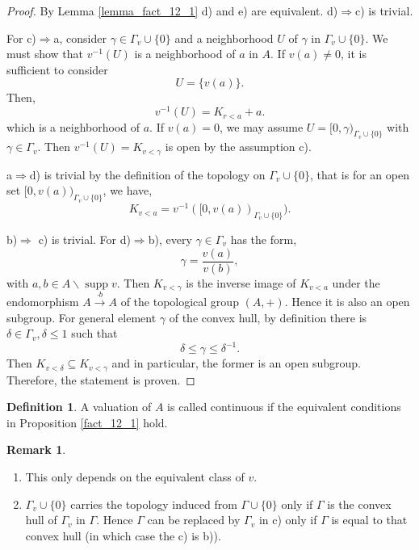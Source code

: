 \documentclass[10pt]{article}
\numberwithin{equation}{section}
\theoremstyle{definition}
\newtheorem{definition}{Definition}[subsection]
\newtheorem{remark}{Remark}[subsection]
\DeclareMathOperator{\supp}{supp}
\begin{document}
\begin{proof}
    By Lemma \ref{lemma_fact_12_1} d) and e) are equivalent. d)$\Rightarrow$c) is trivial.
    \par For c)$\Rightarrow$a, consider $\gamma\in\Gamma_v\cup\{0\}$ and a neighborhood $U$ of $\gamma$ in $\Gamma_v\cup\{0\}$. We must show that $v^{-1}(U)$ is a neighborhood of $a$ in $A$. If $v(a)\not=0$, it is sufficient to consider
    \begin{equation*}
        U = \{v(a)\}.
    \end{equation*}
    Then,
    \begin{equation*}
        v^{-1}(U) = K_{r<a}+a.
    \end{equation*}
    which is a neighborhood of $a$. If $v(a)=0$, we may assume $U=[0,\gamma)_{\Gamma_v\cup\{0\}}$ with $\gamma\in\Gamma_v$. Then $v^{-1}(U)=K_{v<\gamma}$ is open by the assumption c).
    \par a$\Rightarrow$d) is trivial by the definition of the topology on $\Gamma_v\cup\{0\}$, that is for an open set $[0,v(a))_{\Gamma_v\cup\{0\}}$, we have,
    \begin{equation*}
     K_{v<a} = v^{-1}([0,v(a))_{\Gamma_v\cup\{0\}}).
    \end{equation*}
    \par b)$\Rightarrow$ c) is trivial. For d)$\Rightarrow$b), every $\gamma\in\Gamma_v$ has the form,
    \begin{equation*}
        \gamma  = {\frac {v(a)} {v(b)}},
    \end{equation*}
    with $a,b\in A\backslash\supp v$. Then $K_{v<\gamma}$ is the inverse image of $K_{v<a}$ under the endomorphism $A\stackrel{\cdot b}{\to}A$ of the topological group $(A,+)$. Hence it is also an open subgroup. For general element $\gamma$ of the convex hull, by definition there is $\delta\in\Gamma_v,\delta\leq 1$ such that
    \begin{equation}
        \delta\leq \gamma\leq \delta^{-1}.
    \end{equation}
    Then $K_{v<\delta}\subseteq K_{v<\gamma}$ and in particular, the former is an open subgroup. Therefore, the statement is proven.
\end{proof}
\begin{definition}
    \label{definition_12_1}
    A valuation of $A$ is called continuous if the equivalent conditions in Proposition \ref{fact_12_1} hold.
\end{definition}
\begin{remark}$\:$
    \begin{enumerate}
        \item  This only depends on the equivalent class of $v$.
        \item $\Gamma_v\cup\{0\}$ carries the topology induced from $\Gamma\cup\{0\}$ only if $\Gamma$ is the convex hull of $\Gamma_v$ in $\Gamma$. Hence $\Gamma$ can be replaced by $\Gamma_v$ in c) only if $\Gamma$ is equal to that convex hull (in which case the c) is b)).
    \end{enumerate}
\end{remark}
\end{document}
